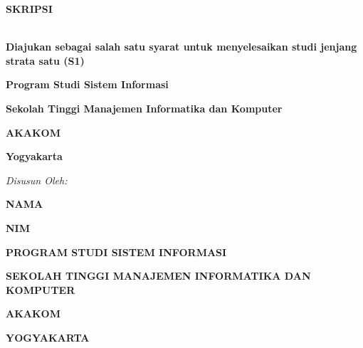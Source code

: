 {}
%
\begin{center}
{\Large \textbf{SKRIPSI}\\[1cm] }
{\Large 
	\textbf{\judulindo}\\[0.3cm]
	\textbf{\textit{\judulinggris}}
}

\vspace{4\baselineskip}

\textbf{Diajukan sebagai salah satu syarat untuk menyelesaikan studi jenjang strata satu (S1)}

\textbf{Program Studi Sistem Informasi}

\textbf{Sekolah Tinggi Manajemen Informatika dan Komputer}

\textbf{AKAKOM}

\textbf{Yogyakarta}

\vspace{3\baselineskip}

\textit{Disusun Oleh:}

\textbf{NAMA}

\textbf{NIM}

\vspace{8\baselineskip}
{\textbf{PROGRAM STUDI SISTEM INFORMASI}
	
	\textbf{SEKOLAH TINGGI MANAJEMEN INFORMATIKA DAN KOMPUTER}
	
	\textbf{AKAKOM}
	
	\textbf{YOGYAKARTA}
	
	\the\year{}
}

\end{center}
